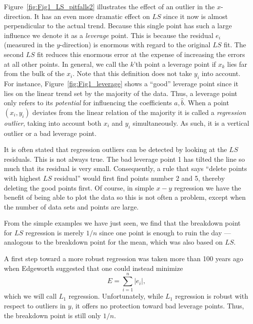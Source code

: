 Figure~\ref{fig:Fig1_LS_pitfalls2} illustrates the effect of an outlier in the $x$-direction.
It has an even more dramatic 
effect on $LS$ since it now is almost perpendicular to the actual trend.  Because this single point 
has such a large influence we denote it as a \emph{leverage} point.
This is because the residual $e_i$ 
(measured in the $y$-direction) is enormous with regard to the original $LS$ fit.  The second $LS$ fit 
reduces this enormous error at the expense of increasing the errors at all other points.  In 
general, we call the $k$'th  point a leverage point if $x_k$ lies far from the bulk of the $x_i$.  Note that this 
definition does not take $y_i$ into account.  For instance, Figure~\ref{fig:Fig1_leverage} shows a ``good'' leverage 
point since it lies on the linear trend set by the majority of the data.  Thus, a leverage point only 
refers to its \emph{potential} for influencing the coefficients $\hat{a}, \hat{b}$.
When a point $(x_i, y_i)$ deviates from the linear relation of the majority it is called a \emph{regression outlier},
taking into account both $x_i$ and $y_i$ simultaneously.  As such, it is a vertical outlier or a bad 
leverage point.
	
It is often stated that regression outliers can be detected by looking at the $LS$ residuals. This is 
not always true.  The bad leverage point 1 has tilted the line so much  that its residual is very 
small.  Consequently, a rule that says ``delete points with highest $LS$ residual'' would first find points 
number 2 and 5, thereby deleting the good points first.  Of course, in simple $x-y$ regression we have the 
benefit of being able to plot the data so this is not often a problem, except when the number of 
data sets and points are large.


From the simple examples we have just seen, we find that the breakdown point for $LS$ 
regression is merely $1/n$ since one point is enough to ruin the day --- analogous to the breakdown 
point for the mean, which was also based on $LS$.
	
A first step toward a more robust regression was taken more than 100 years ago when 
Edgeworth suggested that one could instead minimize
\begin{equation}
E = \sum^n_{i=1} |e_i|,
\end{equation}	 
which we will call $L_1$ regression.  Unfortunately, while $L_1$ regression is robust with respect to 
outliers in $y$, it offers no protection toward bad leverage points.  Thus, the breakdown point is 
still only $1/n$.
	
